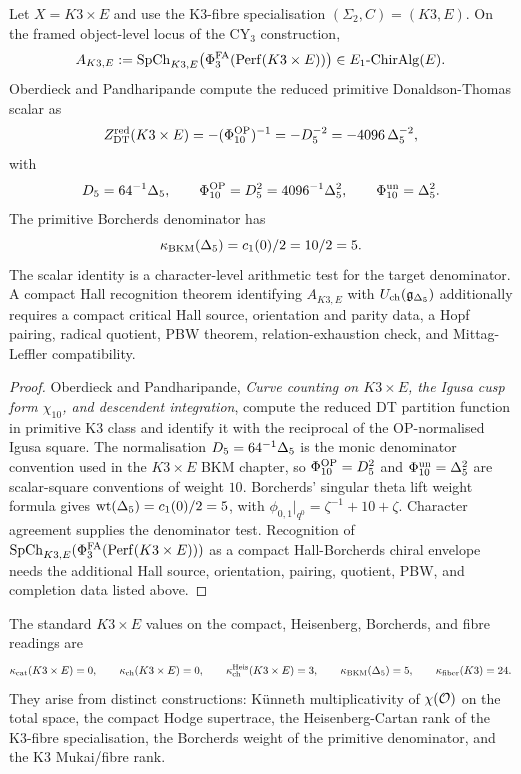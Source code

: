 \begin{proposition}
\label{wn:prop:K3E-PO}
Let $X=K3\times E$ and use the K3-fibre specialisation
$(\Sigma_2,C)=(K3,E)$. On the framed object-level locus of the
CY$_3$ construction,
\[
 A_{K3,E}:=
 \mathrm{SpCh}_{K3,E}\bigl(\Phi^{\mathrm{FA}}_3(\mathrm{Perf}(K3\times E))\bigr)
 \in E_1\text{-}\mathrm{ChirAlg}(E).
\]
Oberdieck and Pandharipande compute the reduced primitive
Donaldson-Thomas scalar as
\[
 Z^{\mathrm{red}}_{\mathrm{DT}}(K3\times E)
 =
 -(\Phi_{10}^{\mathrm{OP}})^{-1}
 =
 -D_5^{-2}
 =
 -4096\,\Delta_5^{-2},
\]
with
\[
 D_5=64^{-1}\Delta_5,\qquad
 \Phi_{10}^{\mathrm{OP}}=D_5^2=4096^{-1}\Delta_5^2,\qquad
 \Phi_{10}^{\mathrm{un}}=\Delta_5^2.
\]
The primitive Borcherds denominator has
\[
 \kappa_{\mathrm{BKM}}(\Delta_5)=c_1(0)/2=10/2=5.
\]
The scalar identity is a character-level arithmetic test for the target
denominator. A compact Hall recognition theorem identifying
$A_{K3,E}$ with $U_{\mathrm{ch}}(\mathfrak{g}_{\Delta_5})$ additionally
requires a compact critical Hall source, orientation and parity data, a
Hopf pairing, radical quotient, PBW theorem, relation-exhaustion check,
and Mittag-Leffler compatibility.
\end{proposition}

\begin{proof}
Oberdieck and Pandharipande, \emph{Curve counting on $K3\times E$, the
Igusa cusp form $\chi_{10}$, and descendent integration}, compute the
reduced DT partition function in primitive K3 class and identify it
with the reciprocal of the OP-normalised Igusa square. The normalisation
$D_5=64^{-1}\Delta_5$ is the monic denominator convention used in
the $K3\times E$ BKM chapter, so $\Phi_{10}^{\mathrm{OP}}=D_5^2$ and
$\Phi_{10}^{\mathrm{un}}=\Delta_5^2$ are scalar-square conventions of weight $10$.
Borcherds' singular theta lift weight formula gives
$\mathrm{wt}(\Delta_5)=c_1(0)/2=5$, with
$\phi_{0,1}|_{q^0}=\zeta^{-1}+10+\zeta$. Character agreement supplies
the denominator test. Recognition of
$\mathrm{SpCh}_{K3,E}(\Phi^{\mathrm{FA}}_3(\mathrm{Perf}(K3\times E)))$ as a compact
Hall-Borcherds chiral envelope needs the additional Hall source,
orientation, pairing, quotient, PBW, and completion data listed above.
\end{proof}

\begin{corollary}
\label{wn:cor:K3E-four-invariants}
The standard $K3\times E$ values on the compact, Heisenberg, Borcherds,
and fibre readings are
\[
 \kappa_{\mathrm{cat}}(K3\times E)=0,\qquad
 \kappa_{\mathrm{ch}}(K3\times E)=0,\qquad
 \kappa_{\mathrm{ch}}^{\mathrm{Heis}}(K3\times E)=3,\qquad
 \kappa_{\mathrm{BKM}}(\Delta_5)=5,\qquad
 \kappa_{\mathrm{fiber}}(K3)=24.
\]
They arise from distinct constructions: K\"unneth multiplicativity of
$\chi(\mathcal{O})$ on the total space, the compact Hodge supertrace, the
Heisenberg-Cartan rank of the K3-fibre specialisation, the Borcherds
weight of the primitive denominator, and the K3 Mukai/fibre rank.
\end{corollary}

